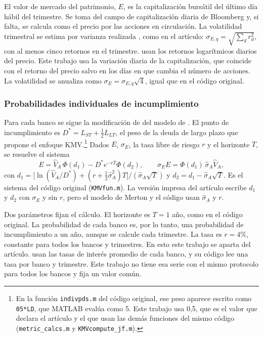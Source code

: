 El valor de mercado del patrimonio, $E$, es la capitalización bursátil del último día hábil del trimestre. Se toma del campo de capitalización diaria de Bloomberg y, si falta, se calcula como el precio por las acciones en circulación. La volatilidad trimestral se estima por varianza realizada \citep{BarndorffNielsenShephard2002}, como en el artículo: $\sigma_{E,q}=\sqrt{\sum_d r_d^2}$, con al menos cinco retornos en el trimestre. \citet{Chari2024b} usan los retornos logarítmicos diarios del precio. Este trabajo usa la variación diaria de la capitalización, que coincide con el retorno del precio salvo en los días en que cambia el número de acciones. La volatilidad se anualiza como $\sigma_E=\sigma_{E,q}\sqrt4$, igual que en el código original.

\subsubsection{Probabilidades individuales de incumplimiento}

Para cada banco se sigue la modificación de \citet{Kealhofer2000} del modelo de \citet{Merton1974b}. El punto de incumplimiento es $D^{*}=L_{ST}+\tfrac12 L_{LT}$, el peso de la deuda de largo plazo que propone el enfoque KMV.\footnote{En la función \texttt{indivpds.m} del código original, ese peso aparece escrito como \texttt{05*LD}, que MATLAB evalúa como 5. Este trabajo usa 0,5, que es el valor que declara el artículo y el que usan las demás funciones del mismo código (\texttt{metric\_calcs.m} y \texttt{KMVcompute\_jf.m}).} Dados $E$, $\sigma_E$, la tasa libre de riesgo $r$ y el horizonte $T$, se resuelve el sistema
\[ E=\hat V_A\,\Phi(d_1)-D^{*}e^{-rT}\Phi(d_2), \qquad \sigma_E E=\Phi(d_1)\,\hat\sigma_A\hat V_A, \]
con $d_1=\bigl[\ln(\hat V_A/D^{*})+(r+\tfrac12\hat\sigma_A^2)T\bigr]/(\hat\sigma_A\sqrt T)$ y $d_2=d_1-\hat\sigma_A\sqrt T$. Es el sistema del código original (\texttt{KMVfun.m}). La versión impresa del artículo escribe $d_1$ y $d_2$ con $\sigma_E$ y sin $r$, pero el modelo de Merton y el código usan $\hat\sigma_A$ y $r$.

Dos parámetros fijan el cálculo. El horizonte es $T=1$ año, como en el código original. La probabilidad de cada banco es, por lo tanto, una probabilidad de incumplimiento a un año, aunque se calcule cada trimestre. La tasa es $r=4\%$, constante para todos los bancos y trimestres. En esto este trabajo se aparta del artículo. \citet{Chari2024b} usan las tasas de interés promedio de cada banco, y su código lee una tasa por banco y trimestre. Este trabajo no tiene esa serie con el mismo protocolo para todos los bancos y fija un valor común.

